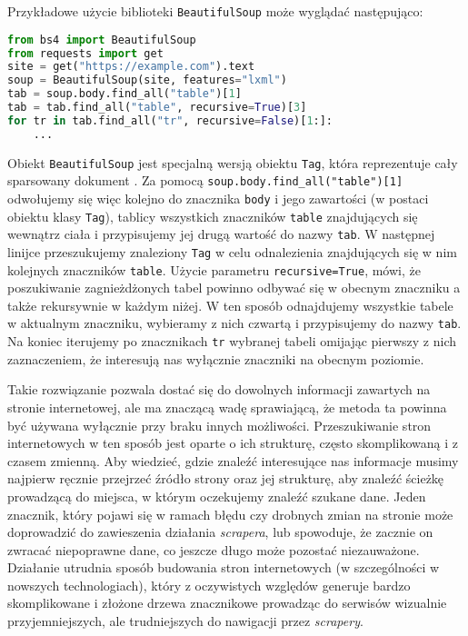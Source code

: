 Przykładowe użycie biblioteki \texttt{BeautifulSoup} może wyglądać następująco:
\begin{lstlisting}[language=Python]
from bs4 import BeautifulSoup
from requests import get
site = get("https://example.com").text
soup = BeautifulSoup(site, features="lxml")
tab = soup.body.find_all("table")[1]
tab = tab.find_all("table", recursive=True)[3]
for tr in tab.find_all("tr", recursive=False)[1:]:
	...
\end{lstlisting}
Obiekt \texttt{BeautifulSoup} jest specjalną wersją obiektu \texttt{Tag}, która reprezentuje cały sparsowany dokument \cite{richardson2007beautiful}.
Za pomocą \lstinline{soup.body.find_all("table")[1]} odwołujemy się więc kolejno do znacznika \texttt{body} i jego zawartości (w postaci obiektu klasy \texttt{Tag}),  tablicy wszystkich znaczników \texttt{table} znajdujących się wewnątrz ciała i przypisujemy jej drugą wartość do nazwy \texttt{tab}.
W następnej linijce przeszukujemy znaleziony \texttt{Tag} w celu odnalezienia znajdujących się w nim kolejnych znaczników \texttt{table}.
Użycie parametru \lstinline{recursive=True}, mówi, że poszukiwanie zagnieżdżonych tabel powinno odbywać się w obecnym znaczniku a także rekursywnie w każdym niżej.
W ten sposób odnajdujemy wszystkie tabele w aktualnym znaczniku, wybieramy z nich czwartą i przypisujemy do nazwy \texttt{tab}.
Na koniec iterujemy po znacznikach \texttt{tr} wybranej tabeli omijając pierwszy z nich zaznaczeniem, że interesują nas wyłącznie znaczniki na obecnym poziomie.

Takie rozwiązanie pozwala dostać się do dowolnych informacji zawartych na stronie internetowej, ale ma znaczącą wadę sprawiającą, że metoda ta powinna być używana wyłącznie przy braku innych możliwości.
Przeszukiwanie stron internetowych w ten sposób jest oparte o ich strukturę, często skomplikowaną i z czasem zmienną.
Aby wiedzieć, gdzie znaleźć interesujące nas informacje musimy najpierw ręcznie przejrzeć źródło strony oraz jej strukturę, aby znaleźć ścieżkę prowadzącą do miejsca, w którym oczekujemy znaleźć szukane dane.
Jeden znacznik, który pojawi się w ramach błędu czy drobnych zmian na stronie może doprowadzić do zawieszenia działania \emph{scrapera}, lub spowoduje, że zacznie on zwracać niepoprawne dane, co jeszcze długo może pozostać niezauważone.
Działanie utrudnia sposób budowania stron internetowych (w szczególności w nowszych technologiach), który z oczywistych względów generuje bardzo skomplikowane i złożone drzewa znacznikowe prowadząc do serwisów wizualnie przyjemniejszych, ale trudniejszych do nawigacji przez \emph{scrapery}.

